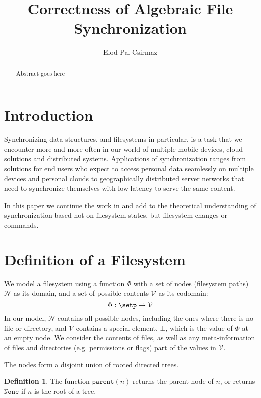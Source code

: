 \documentclass[12pt]{article}
\title{Correctness of Algebraic File Synchronization}
\author{Elod Pal Csirmaz}
\newcommand{\setv}{\mathcal{V}} %
\newcommand{\setn}{\mathcal{N}} %
\newcommand{\empt}{\bot}
\newcommand{\parent}{\mathtt{parent}}
\newcommand{\topnode}{\mathtt{None}} %
\newcommand{\FS}{\Phi} %
\theoremstyle{definition}
\newtheorem{mydef}{Definition}
\begin{document}
\maketitle
\begin{abstract}
Abstract goes here
\end{abstract}

\section{Introduction}

Synchronizing data structures, and filesystems in particular,
is a task that we encounter more and more often in our world
of multiple mobile devices, cloud solutions and distributed systems.
Applications of synchronization ranges from
solutions for end users who expect to access personal data seamlessly
on multiple devices and personal clouds to geographically distributed server networks
that need to synchronize themselves with low latency to serve the 
same content.

In this paper we
continue the work in \cite{NREC:alg} and add to the theoretical understanding
of synchronization based not on filesystem states, but filesystem changes or commands.




\section{Definition of a Filesystem}

We model a filesystem using a function $\FS$ with a set of nodes (filesystem paths) $\setn$ as its domain,
and a set of possible contents $\setv$ as its codomain:
\[ \FS : \setp \rightarrow \setv \] 
In our model, $\setn$ contains all possible nodes, including the ones where there is no file or directory,
and $\setv$ contains a special element, $\empt$, which is the value of $\FS$ at an empty node.
We consider the contents of files, as well as any meta-information of files
and directories (e.g. permissions or flags) part of the values in $\setv$.

The nodes form a disjoint union of rooted directed trees.
\begin{mydef}
The function $\parent(n)$ returns the parent node of $n$, or
returns $\topnode$ if $n$ is the root of a tree.
\end{mydef}
\end{document}
